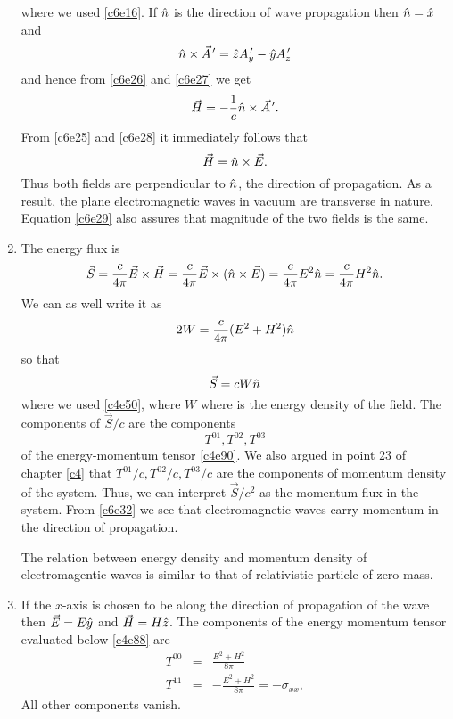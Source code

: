 \begin{enumerate}
\begin{equation}
\end{equation}
where we used \eqref{c6e16}. If $\hat{n}$ is the direction of wave propagation then
$\hat{n} = \hat{x}$ and 
\begin{equation}\label{c6e27}
\hat{n}\times\vec{A}^{\,\prime} = \hat{z}A^{\,\prime}_y - \hat{y}A^{\,\prime}_z
\end{equation}
and hence from \eqref{c6e26} and \eqref{c6e27} we get
\begin{equation}\label{c6e28}
\vec{H} = -\frac{1}{c}\hat{n}\times\vec{A}^{\,\prime}.
\end{equation}
From \eqref{c6e25} and \eqref{c6e28} it immediately follows that
\begin{equation}\label{c6e29}
\vec{H} = \hat{n}\times\vec{E}.
\end{equation}
Thus both fields are perpendicular to $\hat{n}$, the direction of propagation. As a 
result, the plane electromagnetic waves in vacuum are transverse in nature. 
Equation \eqref{c6e29} also assures that magnitude of the two fields is the same.

\item The energy flux is
\begin{equation}\label{c6e30}
\vec{S} = \frac{c}{4\pi}\vec{E}\times\vec{H} = 
\frac{c}{4\pi}\vec{E}\times(\hat{n}\times\vec{E}) = 
\frac{c}{4\pi}E^2\hat{n} = \frac{c}{4\pi}H^2\hat{n}.
\end{equation}
We can as well write it as 
\begin{equation}\label{c6e31}
2W = \frac{c}{4\pi}(E^2 + H^2)\hat{n}
\end{equation}
so that
\begin{equation}\label{c6e32}
\vec{S} = cW\hat{n}
\end{equation}
where we used \eqref{c4e50}, where $W$ where is the energy density of the field.
The components of $\vec{S}/c$ are the components 
\[
T^{01}, T^{02}, T^{03}
\]
of the energy-momentum tensor \eqref{c4e90}. We also argued in point 23 of 
chapter \ref{c4} that $T^{01}/c, T^{02}/c, T^{03}/c$ are the components of 
momentum density of the system. Thus, we can interpret $\vec{S}/c^2$ as the 
momentum flux in the system. From \eqref{c6e32} we see that electromagnetic waves
carry momentum in the direction of propagation.

The relation between energy density and momentum density of electromagentic 
waves is similar to that of relativistic particle of zero mass.

\item If the $x$-axis is chosen to be along the direction of propagation of
the wave then $\vec{E} = E\hat{y}$ and $\vec{H} = H\hat{z}$. The components of the
energy momentum tensor evaluated below \eqref{c4e88} are
\begin{eqnarray}
T^{00} &=& \frac{E^2 + H^2}{8\pi} \label{c6e33} \\
T^{11} &=& -\frac{E^2 + H^2}{8\pi} = -\sigma_{xx} \label{c6e34},
\end{eqnarray}
All other components vanish.


\end{enumerate}
